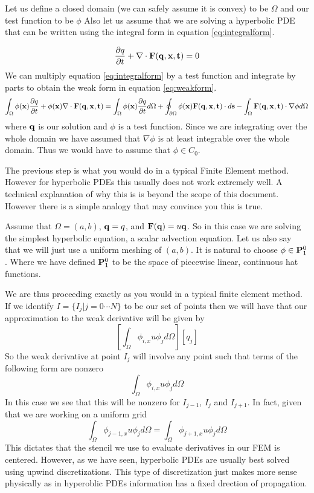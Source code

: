 \documentclass[10]{amsart}
\begin{document}
Let us define a closed domain (we can safely assume it is convex) to be $\Omega$ and our test function to be $\phi$   
Also let us assume that we are solving a hyperbolic PDE that can be written using the integral form in equation
\eqref{eq:integralform}.

\begin{equation}
 \frac{\partial q}{\partial t} + \nabla \cdot {\bf F(q,x,t)}=0
 \label{eq:integralform}
\end{equation}
We can multiply equation \ref{eq:integralform} by a test function and integrate by parts to obtain the weak
form in equation \eqref{eq:weakform}.
\begin{equation}
 \int_{\Omega} \phi({\bf x}) \frac{\partial q}{\partial t} + \phi({\bf x}) \nabla \cdot {\bf F(q,x,t)}
=\int_{\Omega} \phi({\bf x}) \frac{\partial q}{\partial t} d\Omega + \oint_{\partial \Omega} \phi({\bf x}) {\bf F(q,x,t)} \cdot d{\bf s}
 -\int_{\Omega}{\bf F(q,x,t)} \cdot \nabla \phi d\Omega \label{eq:weakform}
 \end{equation}
 where ${\bf q}$ is our solution and $\phi$ is a test function. Since we are integrating over the whole domain
 we have assumed that $\nabla \phi$ is at least integrable over the whole domain. Thus we would have to assume that $\phi \in 
 C_0$. 
 
 The previous step is what you would do in a typical Finite Element method. However for hyperbolic PDEs this usually
 does not work extremely well. A technical explanation of why this is is beyond the scope of this document. However
 there is a simple analogy that may convince you this is true. 
 
 Assume that $\Omega=(a,b)$, ${\bf q}=q$, and ${\bf F({\bf q})}=u {\bf q}$.
 So in this case we are solving the simplest hyperbolic equation, a scalar advection equation.
 Let us also say that we will just use a uniform meshing of $(a,b)$. It is natural to choose $\phi \in {\bf P}_1^0$. Where
 we have defined ${\bf P}_1^0$ to be the space of piecewise linear, continuous hat functions.
 
 We are thus proceeding exactly as you would in a typical finite element method. If we identify $I=\{I_j | j=0\cdots N\}$
 to be our set of points then we will have that our approximation to the weak derivative will be given by
 $$[\int_{\Omega}\phi_{i,x} u\phi_{j} d\Omega ] [q_j]$$
 So the weak derivative at point $I_j$ will involve any point such that terms of the following form are nonzero
 $$\int_{\Omega}\phi_{i,x} u\phi_{j} d\Omega $$
 In this case we see that this will be nonzero for $I_{j-1}$, $I_{j}$ and $I_{j+1}$. In fact, given that we are working on a uniform
 grid 
  $$\int_{\Omega}\phi_{j-1,x} u\phi_{j} d\Omega = \int_{\Omega}\phi_{j+1,x} u\phi_{j} d\Omega $$
 This dictates that the stencil we use to evaluate derivatives in our FEM is centered. However, as we have seen,
 hyperbolic PDEs are usually best solved using upwind discretizations. This type of discretization just makes
 more sense physically as in hyperoblic PDEs information has a fixed drection of propagation. 
 
\end{document}
